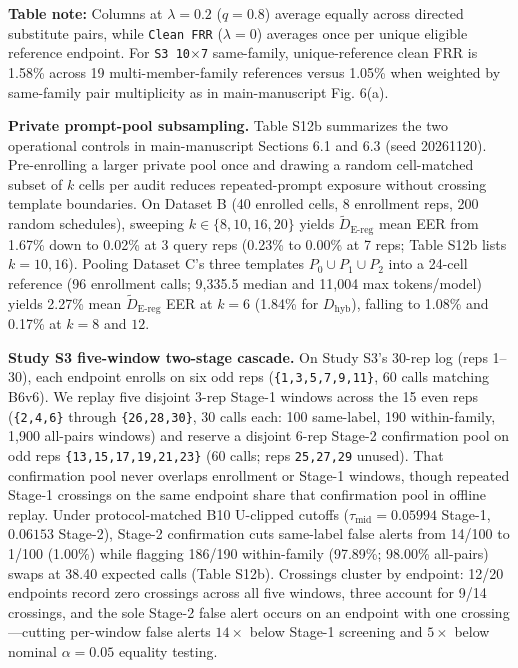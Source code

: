 \documentclass[10pt,letterpaper]{article}
\theoremstyle{definition}
\newcommand{\Dereg}{\tilde D_{\mathrm{E\mbox{-}reg}}}
\newcommand{\Dhyb}{D_{\mathrm{hyb}}}
\begin{document}
\textbf{Table note:} Columns at $\lambda = 0.2$ ($q = 0.8$) average equally across directed substitute pairs, while \texttt{Clean FRR} ($\lambda = 0$) averages once per unique eligible reference endpoint. For \texttt{S3 10\ensuremath{\times}7} same-family, unique-reference clean FRR is 1.58\% across 19 multi-member-family references versus 1.05\% when weighted by same-family pair multiplicity as in main-manuscript Fig. 6(a).


\textbf{Private prompt-pool subsampling.} Table S12b summarizes the two operational controls in main-manuscript Sections 6.1 and 6.3 (seed 20261120). Pre-enrolling a larger private pool once and drawing a random cell-matched subset of $k$ cells per audit reduces repeated-prompt exposure without crossing template boundaries. On Dataset B (40 enrolled cells, 8 enrollment reps, 200 random schedules), sweeping $k \in \{8, 10, 16, 20\}$ yields $\Dereg{}$ mean EER from 1.67\% down to 0.02\% at 3 query reps (0.23\% to 0.00\% at 7 reps; Table S12b lists $k=10, 16$). Pooling Dataset C's three templates $P_0 \cup P_1 \cup P_2$ into a 24-cell reference (96 enrollment calls; 9,335.5 median and 11,004 max tokens/model) yields 2.27\% mean $\Dereg{}$ EER at $k=6$ (1.84\% for $\Dhyb{}$), falling to 1.08\% and 0.17\% at $k=8$ and $12$.


\textbf{Study S3 five-window two-stage cascade.} On Study S3's 30-rep log (reps 1--30), each endpoint enrolls on six odd reps (\texttt{\{1,3,5,7,9,11\}}, 60 calls matching B6v6). We replay five disjoint 3-rep Stage-1 windows across the 15 even reps (\texttt{\{2,4,6\}} through \texttt{\{26,28,30\}}, 30 calls each: 100 same-label, 190 within-family, 1,900 all-pairs windows) and reserve a disjoint 6-rep Stage-2 confirmation pool on odd reps \texttt{\{13,15,17,19,21,23\}} (60 calls; reps \texttt{25,27,29} unused). That confirmation pool never overlaps enrollment or Stage-1 windows, though repeated Stage-1 crossings on the same endpoint share that confirmation pool in offline replay. Under protocol-matched B10 U-clipped cutoffs ($\tau_{\mathrm{mid}} = 0.05994$ Stage-1, $0.06153$ Stage-2), Stage-2 confirmation cuts same-label false alerts from 14/100 to 1/100 (1.00\%) while flagging 186/190 within-family (97.89\%; 98.00\% all-pairs) swaps at 38.40 expected calls (Table S12b). Crossings cluster by endpoint: 12/20 endpoints record zero crossings across all five windows, three account for 9/14 crossings, and the sole Stage-2 false alert occurs on an endpoint with one crossing---cutting per-window false alerts $14\times$ below Stage-1 screening and $5\times$ below nominal $\alpha=0.05$ equality testing.
\end{document}
